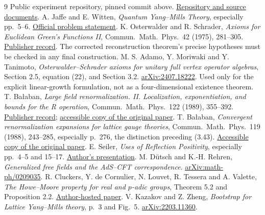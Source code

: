 \documentclass[11pt]{article}
\theoremstyle{remark}
\begin{document}
\begin{thebibliography}{9}
 Public experiment repository, pinned commit above.
\href{https://github.com/ethanwsussman/Yang--Mills-LLM-experiment}
{Repository and source documents}.
 A. Jaffe and E. Witten,
\emph{Quantum Yang--Mills Theory}, especially pp.\ 5--6.
\href{https://www.claymath.org/wp-content/uploads/2022/06/yangmills.pdf}
{Official problem statement}.
 K. Osterwalder and R. Schrader,
\emph{Axioms for Euclidean Green's Functions II},
Commun.\ Math.\ Phys.\ 42 (1975), 281--305.
\href{https://doi.org/10.1007/BF01608978}{Publisher record}.
The corrected reconstruction theorem's precise hypotheses must be
checked in any final construction.
 M. S. Adamo, Y. Moriwaki and Y. Tanimoto,
\emph{Osterwalder--Schrader axioms for unitary full vertex operator
algebras}, Section 2.5, equation (22), and Section 3.2.
\href{https://arxiv.org/abs/2407.18222}{arXiv:2407.18222}.
Used only for the explicit linear-growth formulation, not as a
four-dimensional existence theorem.
 T. Ba\l aban,
\emph{Large field renormalization. II. Localization, exponentiation,
and bounds for the R operation}, Commun.\ Math.\ Phys.\ 122 (1989),
355--392. \href{https://doi.org/10.1007/BF01238433}{Publisher record};
\href{https://scispace.com/pdf/large-field-renormalization-ii-localization-exponentiation-h8b7ih93xo.pdf}
{accessible copy of the original paper}.
 T. Ba\l aban,
\emph{Convergent renormalization expansions for lattice gauge theories},
Commun.\ Math.\ Phys.\ 119 (1988), 243--285, especially p.\ 276,
the distinction preceding (3.43).
\href{https://scispace.com/pdf/convergent-renormalization-expansions-for-lattice-gauge-29jyexd38e.pdf}
{Accessible copy of the original paper}.
 E. Seiler, \emph{Uses of Reflection Positivity},
especially pp.\ 4--5 and 15--17.
\href{https://ethz.ch/content/dam/ethz/special-interest/phys/theoretical-physics/itp-dam/documents/graf/schrader/Seiler.pdf}
{Author's presentation}.
 M. D\"utsch and K.-H. Rehren,
\emph{Generalized free fields and the AdS--CFT correspondence}.
\href{https://arxiv.org/abs/math-ph/0209035}{arXiv:math-ph/0209035}.
 R. Cluckers, Y. de Cornulier, N. Louvet, R. Tessera
and A. Valette, \emph{The Howe--Moore property for real and
$p$-adic groups}, Theorem 5.2 and Proposition 2.2.
\href{https://rcluckers.perso.math.cnrs.fr/prints/CCLTV.pdf}
{Author-hosted paper}.
 V. Kazakov and Z. Zheng,
\emph{Bootstrap for Lattice Yang--Mills theory}, p.\ 3 and Fig.\ 5.
\href{https://arxiv.org/abs/2203.11360}{arXiv:2203.11360}.
\end{thebibliography}
\end{document}
